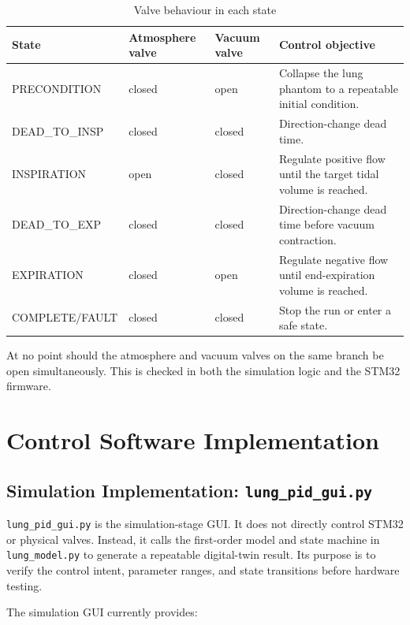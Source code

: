 \documentclass[11pt,a4paper]{article}
\begin{document}
\begin{table}[H]
\centering
\caption{Valve behaviour in each state}
\begin{tabularx}{\textwidth}{p{3.2cm}p{2.8cm}p{2.8cm}X}
\toprule
\textbf{State} & \textbf{Atmosphere valve} & \textbf{Vacuum valve} & \textbf{Control objective} \\
\midrule
PRECONDITION & closed & open & Collapse the lung phantom to a repeatable initial condition. \\
DEAD\_TO\_INSP & closed & closed & Direction-change dead time. \\
INSPIRATION & open & closed & Regulate positive flow until the target tidal volume is reached. \\
DEAD\_TO\_EXP & closed & closed & Direction-change dead time before vacuum contraction. \\
EXPIRATION & closed & open & Regulate negative flow until end-expiration volume is reached. \\
COMPLETE/FAULT & closed & closed & Stop the run or enter a safe state. \\
\bottomrule
\end{tabularx}
\end{table}

At no point should the atmosphere and vacuum valves on the same branch be open simultaneously. This is checked in both the simulation logic and the STM32 firmware.

\section{Control Software Implementation}

\subsection{Simulation Implementation: \texttt{lung\_pid\_gui.py}}

\texttt{lung\_pid\_gui.py} is the simulation-stage GUI. It does not directly control STM32 or physical valves. Instead, it calls the first-order model and state machine in \texttt{lung\_model.py} to generate a repeatable digital-twin result. Its purpose is to verify the control intent, parameter ranges, and state transitions before hardware testing.

The simulation GUI currently provides:
\end{document}
